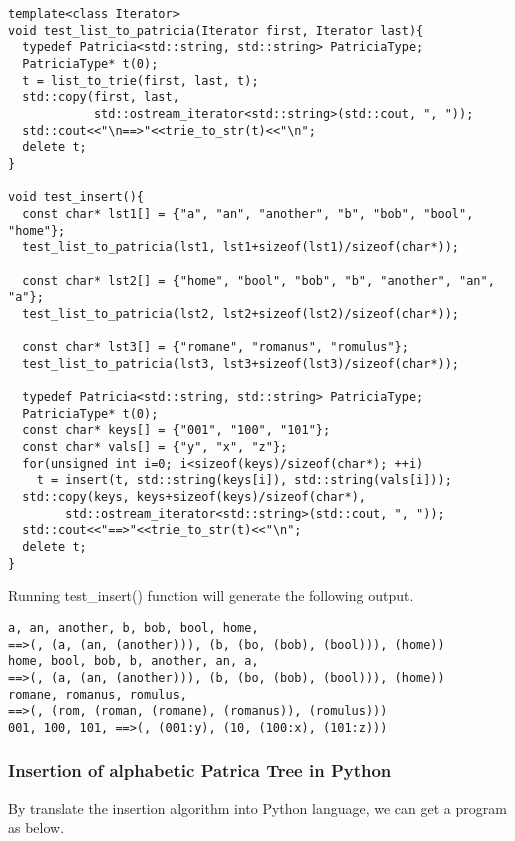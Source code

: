 \documentclass{article}
\begin{document}
\begin{lstlisting}
template<class Iterator>
void test_list_to_patricia(Iterator first, Iterator last){
  typedef Patricia<std::string, std::string> PatriciaType;
  PatriciaType* t(0);
  t = list_to_trie(first, last, t);
  std::copy(first, last,
            std::ostream_iterator<std::string>(std::cout, ", "));
  std::cout<<"\n==>"<<trie_to_str(t)<<"\n";
  delete t;
}

void test_insert(){
  const char* lst1[] = {"a", "an", "another", "b", "bob", "bool", "home"};
  test_list_to_patricia(lst1, lst1+sizeof(lst1)/sizeof(char*));

  const char* lst2[] = {"home", "bool", "bob", "b", "another", "an", "a"};
  test_list_to_patricia(lst2, lst2+sizeof(lst2)/sizeof(char*));

  const char* lst3[] = {"romane", "romanus", "romulus"};
  test_list_to_patricia(lst3, lst3+sizeof(lst3)/sizeof(char*));

  typedef Patricia<std::string, std::string> PatriciaType;
  PatriciaType* t(0);
  const char* keys[] = {"001", "100", "101"};
  const char* vals[] = {"y", "x", "z"};
  for(unsigned int i=0; i<sizeof(keys)/sizeof(char*); ++i)
    t = insert(t, std::string(keys[i]), std::string(vals[i]));
  std::copy(keys, keys+sizeof(keys)/sizeof(char*),
	    std::ostream_iterator<std::string>(std::cout, ", "));
  std::cout<<"==>"<<trie_to_str(t)<<"\n";
  delete t;
}
\end{lstlisting}

Running test\_insert() function will generate the following output.

\begin{verbatim}
a, an, another, b, bob, bool, home,
==>(, (a, (an, (another))), (b, (bo, (bob), (bool))), (home))
home, bool, bob, b, another, an, a,
==>(, (a, (an, (another))), (b, (bo, (bob), (bool))), (home))
romane, romanus, romulus,
==>(, (rom, (roman, (romane), (romanus)), (romulus)))
001, 100, 101, ==>(, (001:y), (10, (100:x), (101:z)))
\end{verbatim}

\subsubsection*{Insertion of alphabetic Patrica Tree in Python}
By translate the insertion algorithm into Python language, we can get a
program as below.
\end{document}

